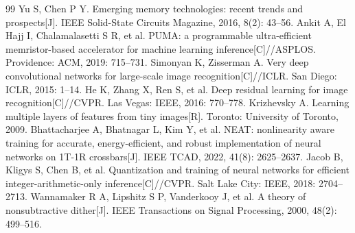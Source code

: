 \documentclass[11pt,a4paper]{ctexart}
\begin{document}
\begin{thebibliography}{99}
 Yu S, Chen P Y. Emerging memory technologies: recent trends and prospects[J]. IEEE Solid-State Circuits Magazine, 2016, 8(2): 43--56.
 Ankit A, El Hajj I, Chalamalasetti S R, et al. PUMA: a programmable ultra-efficient memristor-based accelerator for machine learning inference[C]//ASPLOS. Providence: ACM, 2019: 715--731.
 Simonyan K, Zisserman A. Very deep convolutional networks for large-scale image recognition[C]//ICLR. San Diego: ICLR, 2015: 1--14.
 He K, Zhang X, Ren S, et al. Deep residual learning for image recognition[C]//CVPR. Las Vegas: IEEE, 2016: 770--778.
 Krizhevsky A. Learning multiple layers of features from tiny images[R]. Toronto: University of Toronto, 2009.
 Bhattacharjee A, Bhatnagar L, Kim Y, et al. NEAT: nonlinearity aware training for accurate, energy-efficient, and robust implementation of neural networks on 1T-1R crossbars[J]. IEEE TCAD, 2022, 41(8): 2625--2637.
 Jacob B, Kligys S, Chen B, et al. Quantization and training of neural networks for efficient integer-arithmetic-only inference[C]//CVPR. Salt Lake City: IEEE, 2018: 2704--2713.
 Wannamaker R A, Lipshitz S P, Vanderkooy J, et al. A theory of nonsubtractive dither[J]. IEEE Transactions on Signal Processing, 2000, 48(2): 499--516.
\end{thebibliography}
\end{document}
